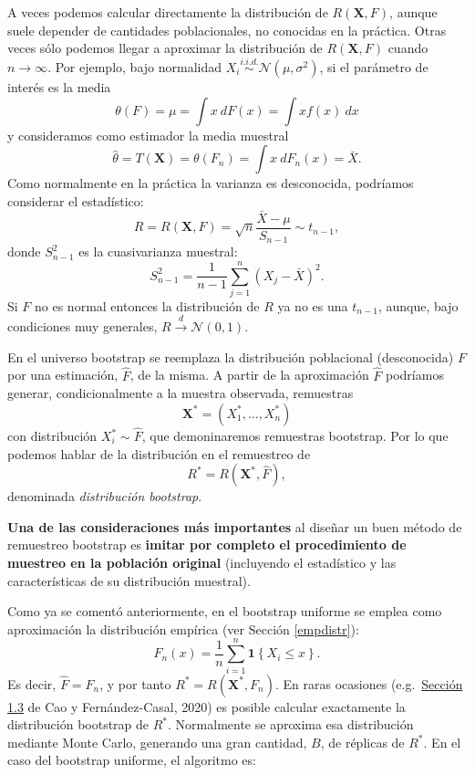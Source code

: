 \documentclass[
]{book}
\theoremstyle{break}
\theoremstyle{nonumberplain}
\begin{document}
A veces podemos calcular directamente la distribución de \(R\left( \mathbf{X},F \right)\), aunque suele depender de cantidades poblacionales, no conocidas en la práctica.
Otras veces sólo podemos llegar a aproximar la distribución de \(R\left( \mathbf{X},F \right)\) cuando \(n \rightarrow \infty\).
Por ejemplo, bajo normalidad \(X_i \overset{i.i.d.}{\sim} \mathcal{N}\left( \mu ,\sigma^2 \right)\), si el parámetro de interés es la media
\[\theta \left( F \right) =\mu =\int x~dF\left( x \right) =\int xf\left( x \right) ~dx\]
y consideramos como estimador la media muestral
\[\hat{\theta} = T\left( \mathbf{X} \right) = \theta \left( F_n \right) =\int x~dF_n\left( x \right) =\bar{X}.\]
Como normalmente en la práctica la varianza es desconocida, podríamos considerar el estadístico:
\[R=R\left( \mathbf{X},F \right) =\sqrt{n}\frac{\bar{X}-\mu }{S_{n-1}} \sim t_{n-1},\]
donde \(S_{n-1}^2\) es la cuasivarianza muestral:
\[S_{n-1}^2=\frac{1}{n-1}\sum_{j=1}^{n}\left( X_j-\bar{X} \right)^2.\]
Si \(F\) no es normal entonces la distribución de \(R\) ya no es una \(t_{n-1}\),
aunque, bajo condiciones muy generales, \(R\overset{d}{\rightarrow}\mathcal{N}\left(0,1 \right)\).

En el universo bootstrap se reemplaza la distribución poblacional (desconocida) \(F\) por una estimación, \(\hat{F}\), de la misma.
A partir de la aproximación \(\hat{F}\) podríamos generar, condicionalmente a la muestra observada, remuestras
\[\mathbf{X}^{\ast}=\left( X_1^{\ast},\ldots ,X_n^{\ast} \right)\]
con distribución \(X_i^{\ast} \sim \hat{F}\), que demoninaremos remuestras bootstrap.
Por lo que podemos hablar de la distribución en el remuestreo de
\[R^{\ast}=R\left( \mathbf{X}^{\ast},\hat{F} \right),\]
denominada \emph{distribución bootstrap}.

\textbf{Una de las consideraciones más importantes} al diseñar un buen método de remuestreo bootstrap es \textbf{imitar por completo el procedimiento de muestreo en la población original} (incluyendo el estadístico y las características de su distribución muestral).

Como ya se comentó anteriormente, en el bootstrap uniforme se emplea como aproximación la distribución empírica (ver Sección \ref{empdistr}):
\[F_n\left( x \right) =\frac{1}{n}\sum_{i=1}^{n}\mathbf{1}\left\{ X_i\leq x\right\}.\]
Es decir, \(\hat{F}=F_n\), y por tanto \(R^{\ast}=R\left( \mathbf{X}^{\ast},F_n \right)\).
En raras ocasiones (e.g.~\href{https://rubenfcasal.github.io/book_remuestreo/c\%C3\%A1lculo-de-la-distribuci\%C3\%B3n-bootstrap-exacta-y-aproximada.html}{Sección 1.3} de Cao y Fernández-Casal, 2020) es posible calcular exactamente la distribución bootstrap de \(R^{\ast}\).
Normalmente se aproxima esa distribución mediante Monte Carlo, generando una gran cantidad, \(B\), de réplicas de \(R^{\ast}\).
En el caso del bootstrap uniforme, el algoritmo es:
\end{document}
